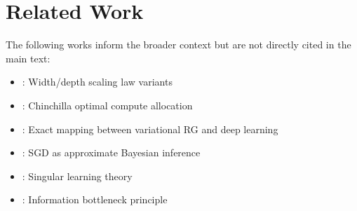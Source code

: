 \documentclass[11pt, a4paper]{article}
\theoremstyle{plain}
\begin{document}



\section*{Related Work}

The following works inform the broader context but are not directly cited in the main text:

\begin{itemize}
\item \citet{valentino2022scaling}: Width/depth scaling law variants
\item \citet{hoffmann2022training}: Chinchilla optimal compute allocation  
\item \citet{mehta2014exact}: Exact mapping between variational RG and deep learning
\item \citet{mandt2017stochastic}: SGD as approximate Bayesian inference
\item \citet{watanabe2009algebraic}: Singular learning theory
\item \citet{tishby2015deep}: Information bottleneck principle
\end{itemize}
\end{document}
